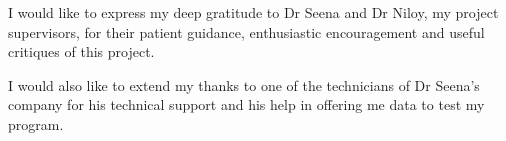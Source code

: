 I would like to express my deep gratitude to Dr Seena and Dr Niloy, my project supervisors, for their patient guidance, enthusiastic encouragement and useful critiques of this project. 

I would also like to extend my thanks to one of the technicians of Dr Seena's company for his technical support and his help in offering me data to test my program.
